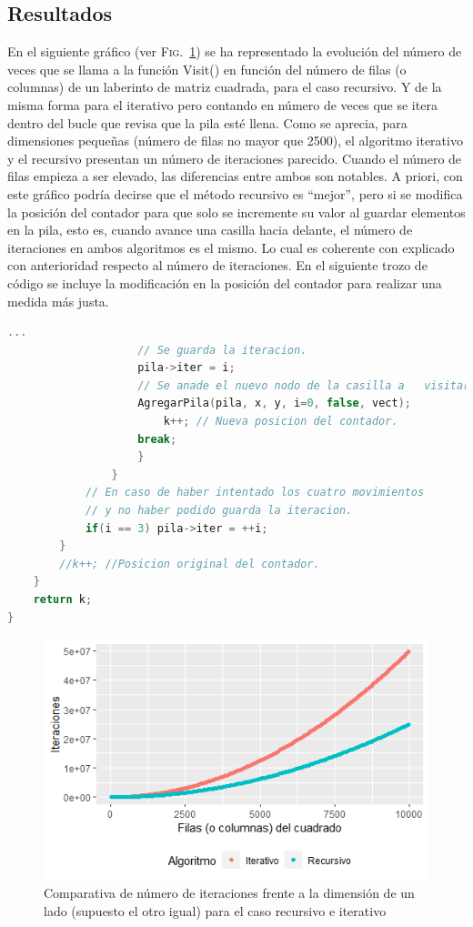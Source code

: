 \documentclass[12pt,a4paper]{article}
\begin{document}
\subsection{Resultados}
En el siguiente gráfico (ver \textsc{Fig.}~\ref{grafico1}) se ha representado la evolución del número de veces que se llama a la función \textsf{Visit()} en función del número de filas (o columnas) de un laberinto de matriz cuadrada, para el caso recursivo. Y de la misma forma para el iterativo pero contando en número de veces que se itera dentro del bucle que revisa que la pila esté llena. Como se aprecia, para dimensiones pequeñas (número de filas no mayor que 2500), el algoritmo iterativo y el recursivo presentan un número de iteraciones parecido. Cuando el número de filas empieza a ser elevado, las diferencias entre ambos son notables. A priori, con este gráfico podría decirse que el método recursivo es ``mejor'', pero si se modifica la posición del contador para que solo se incremente su valor al guardar elementos en la pila, esto es, cuando avance una casilla hacia delante, el número de iteraciones en ambos algoritmos es el mismo. Lo cual es coherente con explicado con anterioridad respecto al número de iteraciones. En el siguiente trozo de código se incluye la modificación en la posición del contador para realizar una medida más justa.

\vspace{0.2cm}
\lstset{style=mystyle}
\begin{lstlisting}[language=C++, title= Variante para el criterio en el contador de iteraciones, frame=single, numbers=none]
					...
					// Se guarda la iteracion.
    				pila->iter = i;
    				// Se anade el nuevo nodo de la casilla a 	visitar.
    				AgregarPila(pila, x, y, i=0, false, vect);
						k++; // Nueva posicion del contador.
    				break;
    				}
				}
    		// En caso de haber intentado los cuatro movimientos
    		// y no haber podido guarda la iteracion.
    		if(i == 3) pila->iter = ++i;
  		}
    	//k++; //Posicion original del contador.
	}
	return k;
}   
\end{lstlisting}

\begin{figure}[h]
	\centering
	\includegraphics[scale=0.9]{fotos/Iteraciones_vs_filas.png}
	\caption{Comparativa de número de iteraciones frente a la dimensión de un lado (supuesto el otro igual) para el caso recursivo e iterativo}
	\label{grafico1}
\end{figure}
\end{document}
